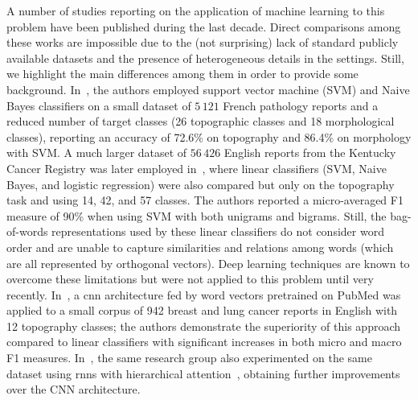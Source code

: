 A number of studies reporting on the application of machine learning
to this problem have been published during the last decade. Direct
comparisons among these works are impossible due to the (not
surprising) lack of standard publicly available datasets and the
presence of 
heterogeneous details in the settings. Still, we highlight the main
differences among them in order to provide some 
background. In~\cite{jouhet_automated_2011}, the authors employed
support vector machine (SVM) and Naive Bayes classifiers on a small
dataset of $5\,121$ French pathology reports and a reduced number of
target classes (26 topographic classes and 18 morphological classes),
reporting an accuracy of 72.6\% on topography and 86.4\% on morphology
with SVM. A much larger dataset of $56\,426$ English reports from the
Kentucky Cancer Registry was later employed
in~\cite{kavuluru_automatic_2013}, where linear classifiers (SVM,
Naive Bayes, and logistic regression) were also compared but only on
the topography task and using 14, 42, and 57 classes. The authors
reported a micro-averaged F1 measure of 90\% when using SVM with both
unigrams and bigrams. Still, the bag-of-words representations used by
these linear classifiers do not consider word order and are
unable to capture similarities and relations among words (which are
all represented by orthogonal vectors). Deep learning techniques are
known to overcome these limitations but were not applied to this
problem until very recently. In~\cite{qiu_deep_2018}, a \ac{cnn}
architecture fed by word vectors pretrained on 
PubMed was applied to a small corpus of 942 breast and lung cancer
reports in English with 12 topography classes; the authors demonstrate
the superiority of this approach compared to linear classifiers with
significant increases in both micro and macro F1
measures. In~\cite{gao_hierarchical_2018}, the same research group also
experimented on the same dataset using \acp{rnn}
with hierarchical attention~\cite{yang_hierarchical_2016}, obtaining
further improvements over the CNN architecture.


